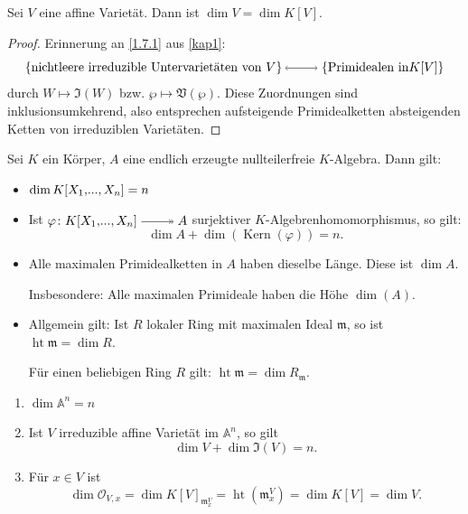 \documentclass[a4paper,12pt,index=toc]{scrbook}
\theoremstyle{keinenummern} %
\def\A{\mathbb{A}}
\def\V{\mathfrak{V}}
\def\I{\mathfrak{I}}
\def\O{\mathcal{O}}
\def\m{\mathfrak{m}}
\newcommand{\Kern}{\operatorname{Kern}}
\newcommand{\hoehe}{\operatorname{ht}}
\renewcommand{\phi}{\varphi}
\renewcommand{\dotsc}{\ensuremath{\!...}}
\newcommand{\polyx}[1][n]{\ensuremath%
  [X_{1},\dotsc,X_{#1}]}
\begin{document}
\begin{prop}\label{3.2.4}
Sei $V$ eine affine Varietät. Dann ist $\dim V=\dim K[V]$. 
\end{prop}
\begin{proof}
Erinnerung an \cref{1.7.1} aus \cref{kap1}:
\[\displaystyle \{\text{nichtleere irreduzible Untervarietäten von }V\} \lra \{\text{Primidealen in}K[V]\}\]
durch $W\mapsto \I(W)$ bzw. $\wp \mapsto \V(\wp)$. Diese Zuordnungen sind inklusionsumkehrend, also entsprechen aufsteigende Primidealketten absteigenden Ketten von irreduziblen Varietäten.
\end{proof}

\begin{erinnerung}\label{3.2.5}
Sei $K$ ein Körper, $A$ eine endlich erzeugte nullteilerfreie $K$-Algebra. Dann gilt:
\begin{itemize}[leftmargin=*,labelindent=\parindent]
  \item $\dim K\polyx=n$
  \item Ist $\phi \colon K\polyx \surj A$ surjektiver $K$-Algebrenhomomorphismus, so gilt: \[\dim A+\dim(\Kern(\phi))=n.\]
  \item Alle maximalen Primidealketten in $A$ haben dieselbe Länge. Diese ist $\dim A$. 

Insbesondere: Alle maximalen Primideale haben die Höhe $\dim(A)$.
  \item Allgemein gilt: Ist $R$ lokaler Ring mit maximalen Ideal $\m$, so ist $\hoehe\m=\dim R$.

Für einen beliebigen Ring $R$ gilt: $\hoehe\m=\dim R_\m$.
\end{itemize}
\end{erinnerung}

\begin{kor}\label{3.2.6}
\begin{enumerate}
  \item $\dim \A^n=n$
  \item Ist $V$ irreduzible affine Varietät im $\A^n$, so gilt 
\[\dim V+\dim \I(V)=n.\]
  \item Für $x \in V$ ist
\[\dim \O_{V,x}=\dim K[V]_{\m_x^V}=\hoehe(\m_x^V)=\dim K[V]=\dim V.\]
\end{enumerate}
\end{kor}
\end{document}
